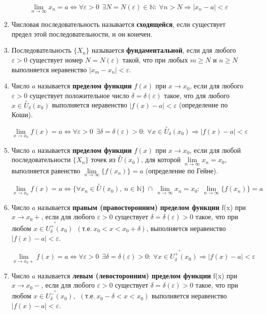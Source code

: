 \begin{enumerate}
$$\lim\limits_{n \to \infty}x_n = a \iff \forall {\varepsilon}>0 \ \ \exists N = N({\varepsilon}) \in \mathbb{N}: \ \forall n > N \Rightarrow | x_n - a|  < {\varepsilon}
    $$
\item Числовая последовательность называется \textbf{сходящейся}, если существует предел этой последовательности, и он конечен.
\item Последовательность $\{X_n\}$ называется \textbf{фундаментальной}, если для любого ${\varepsilon} > 0$ существует номер $N = N({\varepsilon})$ такой, что при любых $m \geqslant N$ и $n \geqslant N$ выполняется неравенство $\mid  x_m - x_n\mid   < {\varepsilon}$.
\item Число $a$ называется \textbf{пределом функции} $f(x)$ при $x \rightarrow x_0$, если для любого ${\varepsilon} > 0$ существует положительное число $\delta = \delta ({\varepsilon})$ такое, что для любого $x \in \overset{\circ}U_\delta(x_0)$ выполняется неравенство $\mid  f(x) - a\mid   < {\varepsilon}$ (определение по Коши).

$$\lim\limits_{x \to x_0} f(x) = a \iff \forall{\varepsilon} > 0 \ \ \exists \delta = \delta({\varepsilon}) > 0 : \ \forall x \in \overset{\circ}U_\delta(x_0) \Rightarrow | f(x) - a|  < {\varepsilon}
    $$
\item Число $a$ называется \textbf{пределом функции} $f(x)$ при $x \rightarrow x_0$, если для любой последовательности $\{X_n\}$ точек из $\overset{\circ}U(x_0)$, для которой $\lim\limits_{n \to \infty}x_n = x_0$, выполняется равенство $\lim\limits_{n \to \infty}\{f(x_n)\} = a$ (определение по Гейне).

$$\lim\limits_{x \to x_0}f(x) = a \iff \{\forall x_n \in \overset{\circ}U(x_0), \ n \in \mathbb{N}\} \ \cap \ \lim\limits_{n \to \infty}{x_n} = x_0 : \ 
    \lim\limits_{n \to \infty}\{f(x_n)\} = a
    $$
\item Число $a$ называется \textbf{правым (правосторонним) пределом функции} f(x) при $x \rightarrow x_0 +$, если для любого ${\varepsilon} > 0$ существует $\delta = \delta({\varepsilon}) > 0$ такое, что при любом $x \in {\overset{\circ\hspace{22pt}}{U^+_\delta(x_0)}} \ \ (\text{т.е.} \ x_0 < x < x_0 + \delta)$, выполняется неравенство $\mid  f(x) - a\mid   < {\varepsilon}$.

$$\lim\limits_{x \to x_0 +} f(x) = a \iff \forall{\varepsilon} > 0 \ \ \exists \delta = \delta({\varepsilon}) > 0 : \ \forall x \in {\overset{\circ\hspace{22pt}}{U^+_\delta(x_0)}}  \Rightarrow | f(x) - a|  < {\varepsilon}
    $$
\item Число $a$ называется \textbf{левым (левосторонним) пределом функции} f(x) при $x \rightarrow x_0 -$, если для любого ${\varepsilon} > 0$ существует $\delta = \delta({\varepsilon}) > 0$ такое, что при любом $x \in {\overset{\circ\hspace{22pt}}{U^-_\delta(x_0)}}, \ \ (\text{т.е.} \ x_0 - \delta < x < x_0)$ выполняется неравенство $\mid  f(x) - a\mid   < {\varepsilon}$.


\end{enumerate}

